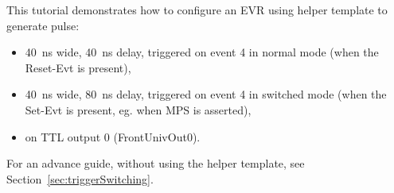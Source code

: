 \documentclass[12pt,a4paper]{article}
\begin{document}
This tutorial demonstrates how to configure an EVR using helper template to generate pulse:
\begin{itemize}
\item 40~ns wide, 40~ns delay, triggered on event 4 in normal mode (when the Reset-Evt is present),
\item 40~ns wide, 80~ns delay, triggered on event 4 in switched mode (when the Set-Evt is present, eg. when MPS is asserted),
\item on TTL output 0 (FrontUnivOut0).
\end{itemize}
For an advance guide, without using the helper template, see Section~\ref{sec:triggerSwitching}.
\end{document}
